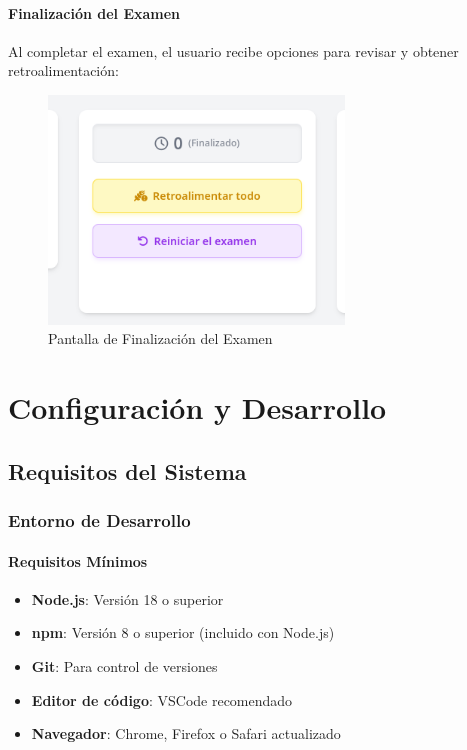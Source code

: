 \documentclass[12pt,a4paper]{report}
\begin{document}
\subsubsection{Finalización del Examen}
Al completar el examen, el usuario recibe opciones para revisar y obtener retroalimentación:

\begin{figure}[h]
\centering
\includegraphics[width=0.7\textwidth]{250617_06h49m37s_screenshot.png}
\caption{Pantalla de Finalización del Examen}
\label{fig:finalizacion_examen}
\end{figure}

\chapter{Configuración y Desarrollo}

\section{Requisitos del Sistema}

\subsection{Entorno de Desarrollo}

\subsubsection{Requisitos Mínimos}
\begin{itemize}
    \item \textbf{Node.js}: Versión 18 o superior
    \item \textbf{npm}: Versión 8 o superior (incluido con Node.js)
    \item \textbf{Git}: Para control de versiones
    \item \textbf{Editor de código}: VSCode recomendado
    \item \textbf{Navegador}: Chrome, Firefox o Safari actualizado
\end{itemize}
\end{document}
